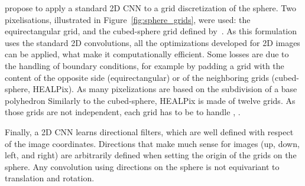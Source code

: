 \documentclass[final,twocolumn,3p,times,authoryear]{elsarticle}
\newcommand{\nati}[1]{{\color[rgb]{.1,.6,.1}{#1}}}
\newcommand{\figref}[1]{Figure~\ref{fig:#1}}
\newcommand{\1}{\b{1}}              %
\newcommand{\0}{\b{0}}              %
\begin{document}
\citet{boomsma2017spherical} propose to apply a standard 2D CNN to a grid discretization of the sphere. Two pixelisations, illustrated in \figref{sphere_grids}, were used: the equirectangular grid, and the cubed-sphere grid defined by~\citet{ronchi1996cubed}.
As this formulation uses the standard 2D convolutions, all the optimizations developed for 2D images can be applied, what make it computationally efficient.
Some losses are due to the handling of boundary conditions, for example by padding a grid with the content of the opposite side (equirectangular) or of the neighboring grids (cubed-sphere, HEALPix).
As many pixelizations are based on the subdivision of a base polyhedron
Similarly to the cubed-sphere, HEALPix is made of twelve grids. As those grids are not independent, each grid has to be  to handle , .


Finally, a 2D CNN learns directional filters, which are well defined with respect of the image coordinates.
Directions that make much sense for images (up, down, left, and right) are arbitrarily defined when setting the origin of the grids on the sphere.
Any convolution using directions on the sphere is not equivariant to translation and rotation.
\end{document}
